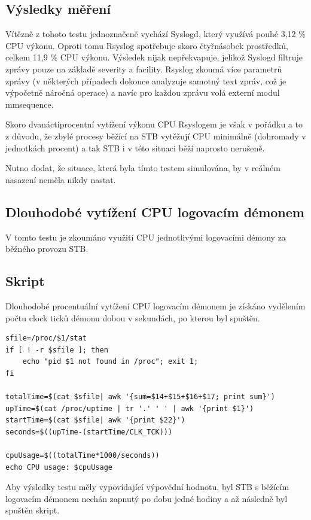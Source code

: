 \documentclass[thesis=B,czech]{FITthesis}[2012/06/26]
\begin{document}
\subsection*{Výsledky měření}
Vítězně z tohoto testu jednoznačeně vychází Syslogd, který využívá pouhé 3,12 \% CPU výkonu. Oproti tomu Rsyslog spotřebuje skoro čtyřnásobek prostředků, celkem 11,9 \% CPU výkonu.
Výsledek nijak nepřekvapuje, jelikož Syslogd filtruje zprávy pouze na základě severity a facility. Rsyslog zkoumá více parametrů zprávy (v některých případech dokonce analyzuje samotný text zpráv, což je výpočetně náročná operace) a navíc pro každou zprávu volá externí modul mmsequence.

Skoro dvanáctiprocentní vytížení výkonu CPU Rsyslogem je však v pořádku a to z důvodu, že zbylé procesy běžící na STB vytěžují CPU minimálně (dohromady v jednotkách  procent) a tak STB i v této situaci běží naprosto nerušeně.

Nutno dodat, že situace, která byla tímto testem simulována, by v reálném nasazení neměla nikdy nastat.

\subsection{Dlouhodobé vytížení CPU logovacím démonem}
V tomto testu je zkoumáno využití CPU jednotlivými logovacími démony za běžného provozu STB.

\subsection*{Skript}
Dlouhodobé procentuální vytížení CPU logovacím démonem je získáno vydělením počtu clock ticků démonu dobou v sekundách, po kterou byl spuštěn.

\begin{lstlisting}[style=AshStyle]
sfile=/proc/$1/stat
if [ ! -r $sfile ]; then
    echo "pid $1 not found in /proc"; exit 1;
fi

totalTime=$(cat $sfile| awk '{sum=$14+$15+$16+$17; print sum}')
upTime=$(cat /proc/uptime | tr '.' ' ' | awk '{print $1}')
startTime=$(cat $sfile| awk '{print $22}')
seconds=$((upTime-(startTime/CLK_TCK)))

cpuUsage=$((totalTime*1000/seconds))
echo CPU usage: $cpuUsage
\end{lstlisting}
Aby výsledky testu měly vypovídající výpovědní hodnotu, byl STB s běžícím logovacím démonem nechán zapnutý po dobu jedné hodiny a až následně byl spuštěn skript.
\end{document}
